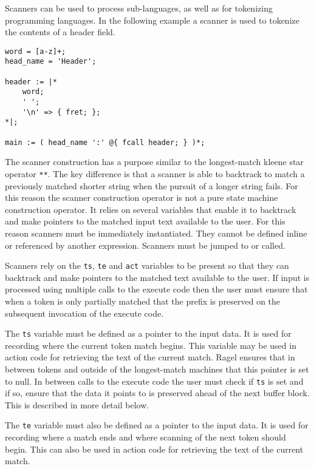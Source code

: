 \documentclass[letterpaper,11pt,oneside]{book}
\newcommand{\verbspace}{\vspace{10pt}}
\newenvironment{inline_code}{\def\baselinestretch{1}\vspace{12pt}\small}{}
\begin{document}
Scanners can be used to process sub-languages, as well as for tokenizing
programming languages. In the following example a scanner is used to tokenize
the contents of a header field.

\begin{inline_code}
\begin{verbatim}
word = [a-z]+;
head_name = 'Header';

header := |*
    word;
    ' ';
    '\n' => { fret; };
*|;

main := ( head_name ':' @{ fcall header; } )*;
\end{verbatim}
\end{inline_code}
\verbspace

The scanner construction has a purpose similar to the longest-match kleene star
operator \verb|**|. The key
difference is that a scanner is able to backtrack to match a previously matched
shorter string when the pursuit of a longer string fails.  For this reason the
scanner construction operator is not a pure state machine construction
operator. It relies on several variables that enable it to backtrack and make
pointers to the matched input text available to the user.  For this reason
scanners must be immediately instantiated. They cannot be defined inline or
referenced by another expression. Scanners must be jumped to or called.

Scanners rely on the \verb|ts|, \verb|te| and \verb|act|
variables to be present so that they can backtrack and make pointers to the
matched text available to the user. If input is processed using multiple calls
to the execute code then the user must ensure that when a token is only
partially matched that the prefix is preserved on the subsequent invocation of
the execute code.

The \verb|ts| variable must be defined as a pointer to the input data.
It is used for recording where the current token match begins. This variable
may be used in action code for retrieving the text of the current match.  Ragel
ensures that in between tokens and outside of the longest-match machines that
this pointer is set to null. In between calls to the execute code the user must
check if \verb|ts| is set and if so, ensure that the data it points to is
preserved ahead of the next buffer block. This is described in more detail
below.

The \verb|te| variable must also be defined as a pointer to the input data.
It is used for recording where a match ends and where scanning of the next
token should begin. This can also be used in action code for retrieving the
text of the current match.
\end{document}
